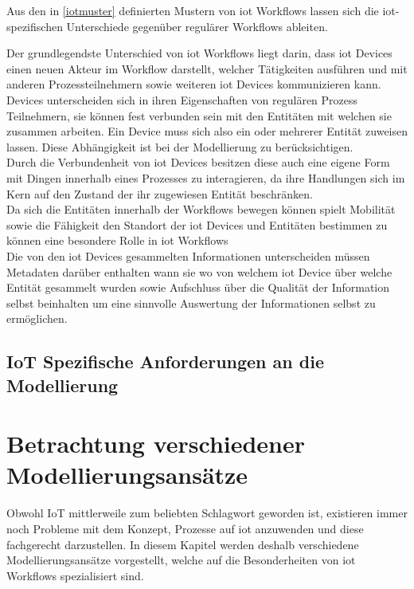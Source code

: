 \documentclass[a4paper, 12pt, twoside, headsepline=true]{scrartcl} %
\begin{document}
Aus den in \ref{iotmuster} definierten Mustern von \ac{iot} Workflows lassen sich die \ac{iot}-spezifischen Unterschiede gegenüber regulärer Workflows ableiten. 

Der grundlegendste Unterschied von \ac{iot} Workflows liegt darin, dass \ac{iot} Devices einen neuen Akteur im Workflow darstellt, welcher Tätigkeiten ausführen und mit anderen Prozessteilnehmern sowie weiteren \ac{iot} Devices kommunizieren kann. \\
Devices unterscheiden sich in ihren Eigenschaften von regulären Prozess Teilnehmern, sie können fest verbunden sein mit den Entitäten mit welchen sie zusammen arbeiten. Ein Device muss sich also ein oder mehrerer Entität zuweisen lassen. Diese Abhängigkeit ist bei der Modellierung zu berücksichtigen. \\
Durch die Verbundenheit von \ac{iot} Devices besitzen diese auch eine eigene Form mit Dingen innerhalb eines Prozesses zu interagieren, da ihre Handlungen sich im Kern auf den Zustand der ihr zugewiesen Entität beschränken.\\
Da sich die Entitäten innerhalb der Workflows bewegen können spielt Mobilität sowie die Fähigkeit den Standort der \ac{iot} Devices und Entitäten bestimmen zu können eine besondere Rolle in \ac{iot} Workflows\\
Die von den \ac{iot} Devices gesammelten Informationen unterscheiden müssen Metadaten darüber enthalten wann sie wo von welchem \ac{iot} Device über welche Entität gesammelt wurden sowie Aufschluss über die Qualität der Information selbst beinhalten um eine sinnvolle Auswertung der Informationen selbst zu ermöglichen.



\subsection{IoT Spezifische Anforderungen an die Modellierung}
 
\section{Betrachtung verschiedener Modellierungsansätze}
Obwohl IoT mittlerweile zum beliebten Schlagwort geworden ist, existieren immer noch Probleme mit dem Konzept, Prozesse auf \ac{iot} anzuwenden und diese fachgerecht darzustellen. In diesem Kapitel werden deshalb verschiedene Modellierungsansätze vorgestellt, welche auf die Besonderheiten von \ac{iot} Workflows spezialisiert sind.
\end{document}
